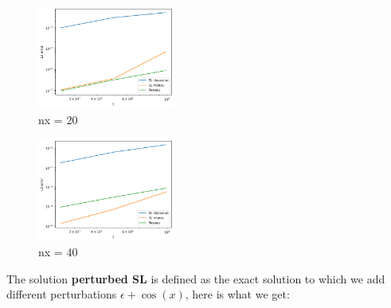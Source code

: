 \documentclass{article}
\begin{document}
\begin{figure}[!h]
    \centering
    \includegraphics[width=0.4\textwidth]{images/i120.png}
    \caption{nx = 20}
\end{figure}

\begin{figure}[!h]
    \centering
    \includegraphics[width=0.4\textwidth]{images/i1.png}
    \caption{nx = 40}
\end{figure}

\newpage

The solution \textbf{perturbed SL} is defined as the exact solution to which we add different perturbations $\epsilon + \cos(x)$, here is what we get:\\
\end{document}
